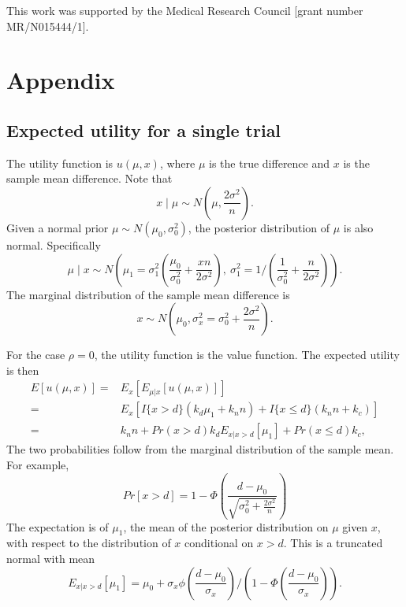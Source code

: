 \documentclass[sagev, Crown]{sagej} %
\begin{document}
\begin{funding}
This work was supported by the Medical Research Council [grant number MR/N015444/1].
\end{funding}




\section*{Appendix}

\subsection*{Expected utility for a single trial}

The utility function is $u(\mu, x)$, where $\mu$ is the true difference and $x$ is the sample mean difference. Note that
$$
x \mid \mu \sim N\left(\mu, \frac{2\sigma^2}{n} \right).
$$
Given a normal prior $\mu \sim N(\mu_0, \sigma_0^2)$, the posterior distribution of $\mu$ is also normal. Specifically
$$
\mu \mid x \sim N \left( \mu_1 = \sigma_1^2 \left( \frac{\mu_0}{\sigma_0^2} + \frac{xn}{2\sigma^2} \right), ~ \sigma_1^2 = 1/\left( \frac{1}{\sigma_0^2} + \frac{n}{2\sigma^2} \right) \right).
$$
The marginal distribution of the sample mean difference is
$$
x \sim N\left(\mu_0, \sigma_x^2 = \sigma_0^2 + \frac{2\sigma^2}{n} \right).
$$

For the case $\rho = 0$, the utility function is the value function. The expected utility is then
\begin{align*}
E[u(\mu, x)] =& E_x\left[ E_{\mu | x} [u(\mu, x)] \right] \\
=& E_x \left[ I\{x > d\} (k_d \mu_1 + k_n n) + I\{x \leq d\} (k_n n + k_c) \right] \\
=& k_n n + Pr(x > d) k_d E_{x | x > d} \left[ \mu_1 \right] + Pr(x \leq d)k_c,
\end{align*}
The two probabilities follow from the marginal distribution of the sample mean. For example,
$$
Pr[x > d] = 1- \Phi\left(\frac{d-\mu_0}{\sqrt{\sigma_0^2 + \frac{2\sigma^2}{n}}} \right)
$$
The expectation is of $\mu_1$, the mean of the posterior distribution on $\mu$ given $x$, with respect to the distribution of $x$ conditional on $x > d$. This is a truncated normal with mean
$$
E_{x | x > d} \left[ \mu_1 \right] = \mu_0 + \sigma_x \phi\left(\frac{d - \mu_0}{\sigma_x} \right)/\left(1 - \Phi\left(\frac{d - \mu_0}{\sigma_x}\right) \right).
$$
\end{document}
